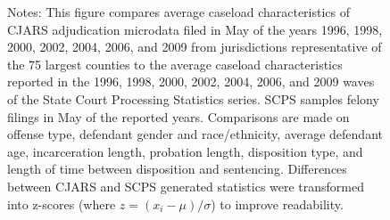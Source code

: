 \begin{figure}
\begin{minipage}{\linewidth}
Notes: This figure compares average caseload characteristics of CJARS adjudication microdata filed in May of the years 1996, 1998, 2000, 2002, 2004, 2006, and 2009 from jurisdictions representative of the 75 largest counties to the average caseload characteristics reported in the 1996, 1998, 2000, 2002, 2004, 2006, and 2009 waves of the State Court Processing Statistics series. SCPS samples felony filings in May of the reported years. Comparisons are made on offense type, defendant gender and race/ethnicity, average defendant age, incarceration length, probation length, disposition type, and length of time between disposition and sentencing. Differences between CJARS and SCPS generated statistics were transformed into z-scores (where $z = (x_i-\mu)\slash{\sigma}$) to improve readability.
\end{minipage}
\end{figure}
